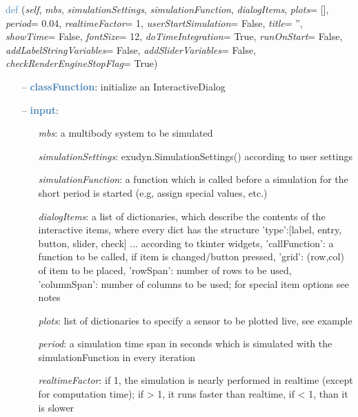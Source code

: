 \begin{itemize}[leftmargin=1.4cm]
\begin{itemize}[leftmargin=1.4cm]
\begin{itemize}[leftmargin=0.5cm]
\begin{itemize}[leftmargin=1.4cm]
\begin{itemize}[leftmargin=1.4cm]
\begin{itemize}[leftmargin=0.5cm]
\begin{itemize}[leftmargin=1.4cm]
\begin{itemize}[leftmargin=0.5cm]
\begin{itemize}[leftmargin=1.4cm]
\begin{itemize}[leftmargin=1.4cm]
\begin{flushleft}
\noindent \textcolor{steelblue}{def {\bf {}}}\label{sec:interactive:InteractiveDialog:__init__}
({\it self}, {\it mbs}, {\it simulationSettings}, {\it simulationFunction}, {\it dialogItems}, {\it plots}= [], {\it period}= 0.04, {\it realtimeFactor}= 1, {\it userStartSimulation}= False, {\it title}= '', {\it showTime}= False, {\it fontSize}= 12, {\it doTimeIntegration}= True, {\it runOnStart}= False, {\it addLabelStringVariables}= False, {\it addSliderVariables}= False, {\it checkRenderEngineStopFlag}= True)
\end{flushleft}
\setlength{\itemindent}{0.7cm}
\begin{itemize}[leftmargin=0.7cm]
  \item[--]  \textcolor{steelblue}{\bf classFunction}: initialize an InteractiveDialog  \item[--]  \textcolor{steelblue}{\bf input}: \vspace{-6pt}
  \begin{itemize}[leftmargin=1.2cm]
\setlength{\itemindent}{-0.7cm}
    \item[] {\it mbs}: a multibody system to be simulated
    \item[] {\it   simulationSettings}: exudyn.SimulationSettings() according to user settings
    \item[] {\it   simulationFunction}: a function which is called before a simulation for the short period is started (e.g, assign special values, etc.)
    \item[] {\it   dialogItems}: a list of dictionaries, which describe the contents of the interactive items, where every dict has the structure {'type':[label, entry, button, slider, check] ... according to tkinter widgets, 'callFunction': a function to be called, if item is changed/button pressed, 'grid': (row,col) of item to be placed, 'rowSpan': number of rows to be used, 'columnSpan': number of columns to be used; for special item options see notes}
    \item[] {\it   plots}: list of dictionaries to specify a sensor to be plotted live, see example
    \item[] {\it   period}: a simulation time span in seconds which is simulated with the simulationFunction in every iteration
    \item[] {\it   realtimeFactor}: if 1, the simulation is nearly performed in realtime (except for computation time); if > 1, it runs faster than realtime, if < 1, than it is slower

\end{itemize}
\end{itemize}
\end{itemize}
\end{itemize}
\end{itemize}
\end{itemize}
\end{itemize}
\end{itemize}
\end{itemize}
\end{itemize}
\end{itemize}
\end{itemize}
